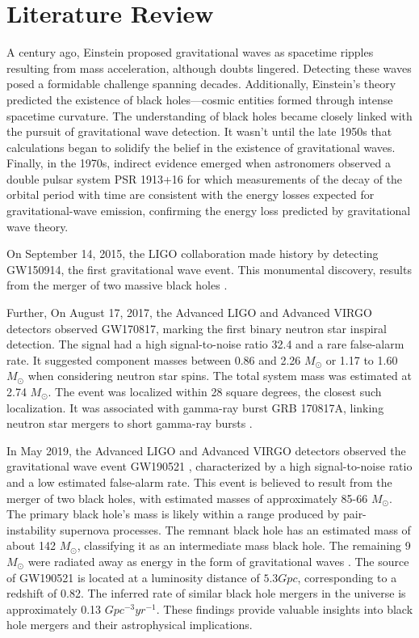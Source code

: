 \section{Literature Review}
A century ago, Einstein proposed gravitational waves as spacetime ripples resulting from mass acceleration, although doubts lingered. Detecting these waves posed a formidable challenge spanning decades. Additionally, Einstein's theory predicted the existence of black holes—cosmic entities formed through intense spacetime curvature. The understanding of black holes became closely linked with the pursuit of gravitational wave detection. It wasn't until the late 1950s that calculations began to solidify the belief in the existence of gravitational waves. Finally, in the 1970s, indirect evidence emerged when astronomers observed a double pulsar system PSR 1913+16 \citep{1975ApJ...195L..51H} for which measurements of the decay of the orbital period with time are consistent with the energy losses expected for gravitational-wave emission, confirming the energy loss predicted by gravitational wave theory.
\vspace{0.2cm}

On September 14, 2015, the LIGO collaboration made history by detecting GW150914, the first gravitational wave event. This monumental discovery, results from the merger of two massive black holes \citep{abbott2016observation}.
\vspace{0.2cm}

Further, On August 17, 2017, the Advanced LIGO and Advanced VIRGO detectors observed GW170817, marking the first binary neutron star inspiral detection. The signal had a high signal-to-noise ratio 32.4 and a rare false-alarm rate. It suggested component masses between 0.86 and 2.26 $M_\odot$ or 1.17 to 1.60 $M_\odot$ when considering neutron star spins. The total system mass was estimated at 2.74 $M_\odot$. The event was localized within 28 square degrees, the closest such localization. It was associated with gamma-ray burst GRB 170817A, linking neutron star mergers to short gamma-ray bursts \citep{2017ApJ...848L..12A}.
\vspace{0.2cm}

In May 2019, the Advanced LIGO and Advanced VIRGO detectors observed the gravitational wave event GW190521 \citep{abbott2020gw190521}\citep{martin2020gw190521}, characterized by a high signal-to-noise ratio and a low estimated false-alarm rate. This event is believed to result from the merger of two black holes, with estimated masses of approximately 85-66 $M_\odot$. The primary black hole's mass is likely within a range produced by pair-instability supernova processes. The remnant black hole has an estimated mass of about 142 $M_\odot$, classifying it as an intermediate mass black hole. The remaining 9 $M_\odot$ were radiated away as energy in the form of gravitational waves \citep{abbott2020properties}\citep{abbott2020gw190521}. The source of GW190521 is located at a luminosity distance of $5.3 Gpc$, corresponding to a redshift of 0.82. The inferred rate of similar black hole mergers in the universe is approximately 0.13 $Gpc^{-3} yr^{-1}$. These findings provide valuable insights into black hole mergers and their astrophysical implications.
\vspace{0.2cm}

